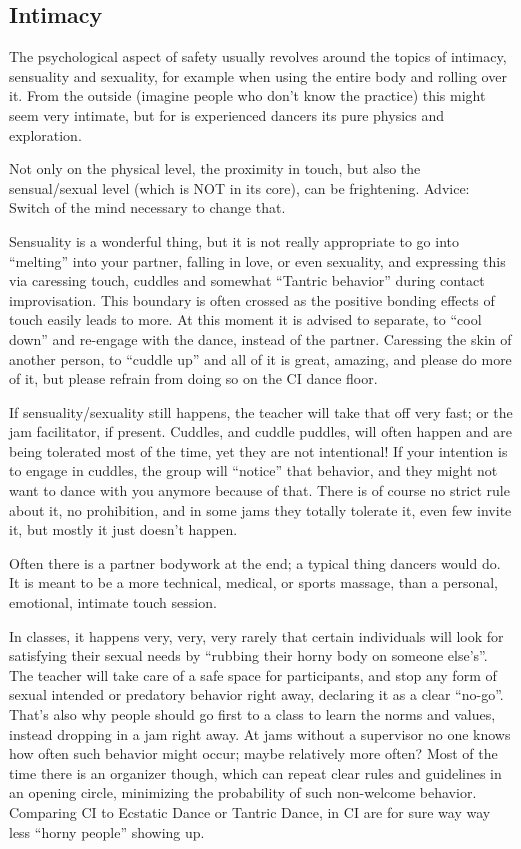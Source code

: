 \subsection{Intimacy}\label{subsec:intimacy}

The psychological aspect of safety usually revolves around the topics of intimacy, sensuality and sexuality,
for example when using the entire body and rolling over it.
From the outside (imagine people who don't know the practice) this might seem very intimate, but for is experienced dancers its pure physics and exploration.

Not only on the physical level, the proximity in touch, but also the sensual/sexual level (which is NOT in its core), can be frightening.
Advice: Switch of the mind necessary to change that.

Sensuality is a wonderful thing, but it is not really appropriate to go into ``melting'' into your partner, falling in love, or even sexuality, and expressing this via caressing touch, cuddles and somewhat ``Tantric behavior'' during contact improvisation.
This boundary is often crossed as the positive bonding effects of touch easily leads to more.
At this moment it is advised to separate, to ``cool down'' and re-engage with the dance, instead of the partner.
Caressing the skin of another person, to ``cuddle up'' and all of it is great, amazing, and please do more of it, but please refrain from doing so on the CI dance floor.

If sensuality/sexuality still happens, the teacher will take that off very fast; or the jam facilitator, if present.
Cuddles, and cuddle puddles, will often happen and are being tolerated most of the time, yet they are not intentional!
If your intention is to engage in cuddles, the group will ``notice'' that behavior, and they might not want to dance with you anymore because of that.
There is of course no strict rule about it, no prohibition, and in some jams they totally tolerate it, even few invite it, but mostly it just doesn't happen.

Often there is a partner bodywork at the end; a typical thing dancers would do.
It is meant to be a more technical, medical, or sports massage, than a personal, emotional, intimate touch session.

In classes, it happens very, very, very rarely that certain individuals will look for satisfying their sexual needs by ``rubbing their horny body on someone else's''.
The teacher will take care of a safe space for participants, and stop any form of sexual intended or predatory behavior right away, declaring it as a clear ``no-go''.
That's also why people should go first to a class to learn the norms and values, instead dropping in a jam right away.
At jams without a supervisor no one knows how often such behavior might occur; maybe relatively more often?
Most of the time there is an organizer though, which can repeat clear rules and guidelines in an opening circle, minimizing the probability of such non-welcome behavior.
Comparing CI to Ecstatic Dance or Tantric Dance, in CI are for sure way way less ``horny people'' showing up.

